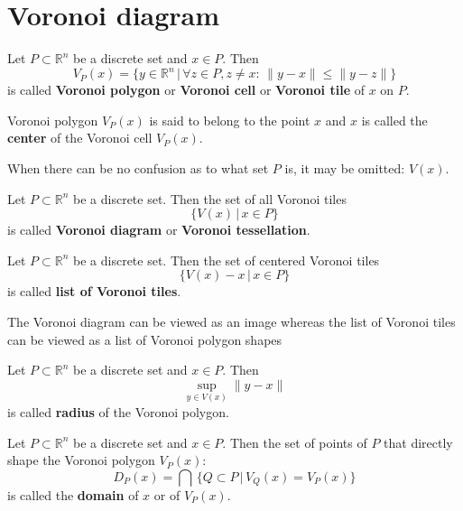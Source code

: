 \documentclass[text.tex]{subfiles}
\begin{document}
\section{Voronoi diagram}\label{sec_voronoi} %
\begin{definition}
Let $P\subset \mathbb{R}^n$ be a discrete set and $x\in P$. Then
$$V_P(x) = \{ y \in \mathbb{R}^n \,|\, \forall z \in P, z\neq x:\, \|y-x\|\leq\|y-z\| \}$$
is called \textbf{Voronoi polygon} or \textbf{Voronoi cell} or \textbf{Voronoi tile} of $x$ on $P$.

Voronoi polygon $V_P(x)$ is said to belong to the point $x$ and $x$ is called the \textbf{center} of the Voronoi cell $V_P(x)$. 

When there can be no confusion as to what set $P$ is, it may be omitted: $V(x)$.
\end{definition}

\begin{definition}
Let $P\subset \mathbb{R}^n$ be a discrete set. Then the set of all Voronoi tiles
$$\{V(x)\,|\, x\in P\}$$
is called \textbf{Voronoi diagram} or \textbf{Voronoi tessellation}. 
\end{definition}

\begin{definition}
Let $P\subset \mathbb{R}^n$ be a discrete set. Then the set of centered Voronoi tiles
$$\{V(x)-x\,|\, x\in P\}$$
is called \textbf{list of Voronoi tiles}.
\end{definition}

\begin{remark}
The Voronoi diagram can be viewed as an image whereas the list of Voronoi tiles can be viewed as a list of Voronoi polygon shapes
\end{remark}

\begin{definition}
Let $P\subset \mathbb{R}^n$ be a discrete set and $x\in P$. Then
$$\sup_{y\in V(x)}\lVert y-x\rVert$$
is called \textbf{radius} of the Voronoi polygon. 
\end{definition}

\begin{definition}
Let $P\subset \mathbb{R}^n$ be a discrete set and $x\in P$. Then the set of points of $P$ that directly shape the Voronoi polygon $V_P(x)$:
$$D_P(x) = \bigcap\, \big\{ Q\subset P\,|\, V_Q(x) = V_P(x) \big\}$$
is called the \textbf{domain} of $x$ or of $V_P(x)$. 
\end{definition}
\end{document}
